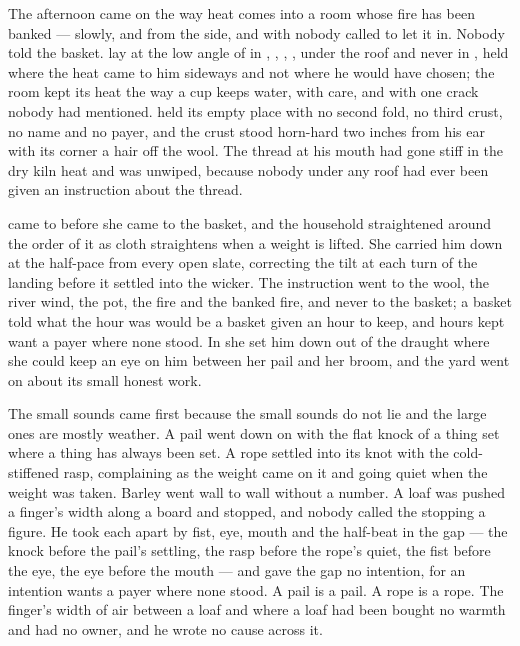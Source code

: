 The afternoon came on the way heat comes into a room whose fire has been banked --- slowly, and from the side, and with nobody called to let it in. Nobody told the basket.  lay at the low angle of  in , , , , under the roof and never in , held where the heat came to him sideways and not where he would have chosen; the room kept its heat the way a cup keeps water, with care, and with one crack nobody had mentioned.  held its empty place with no second fold, no third crust, no name and no payer, and the crust stood horn-hard two inches from his ear with its corner a hair off the wool. The thread at his mouth had gone stiff in the dry kiln heat and was unwiped, because nobody under any roof had ever been given an instruction about the thread.

 came to  before she came to the basket, and the household straightened around the order of it as cloth straightens when a weight is lifted. She carried him down  at the half-pace from every open slate, correcting the tilt at each turn of the landing before it settled into the wicker. The instruction went to the wool, the river wind, the pot, the fire and the banked fire, and never to the basket; a basket told what the hour was would be a basket given an hour to keep, and hours kept want a payer where none stood. In  she set him down out of the draught where she could keep an eye on him between her pail and her broom, and the yard went on about its small honest work.

The small sounds came first because the small sounds do not lie and the large ones are mostly weather. A pail went down on  with the flat knock of a thing set where a thing has always been set. A rope settled into its knot with the cold-stiffened rasp, complaining as the weight came on it and going quiet when the weight was taken. Barley went wall to wall without a number. A loaf was pushed a finger's width along a board and stopped, and nobody called the stopping a figure. He took each apart by fist, eye, mouth and the half-beat in the gap --- the knock before the pail's settling, the rasp before the rope's quiet, the fist before the eye, the eye before the mouth --- and gave the gap no intention, for an intention wants a payer where none stood. A pail is a pail. A rope is a rope. The finger's width of air between a loaf and where a loaf had been bought no warmth and had no owner, and he wrote no cause across it.

